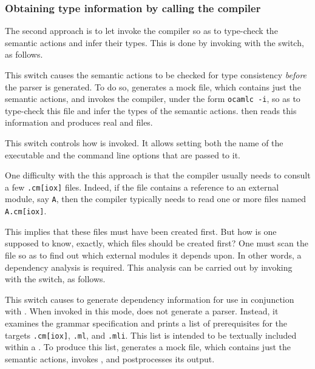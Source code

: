 \documentclass[onecolumn,11pt,nocopyrightspace,preprint]{sigplanconf}
\begin{document}
\subsubsection{Obtaining \ocaml type information by calling the \ocaml compiler}
\label{sec:build:infer:direct}

The second approach is to let \menhir invoke the \ocaml compiler so as to
type-check the semantic actions and infer their types. This is done by
invoking \menhir with the \oinfer switch, as follows.

\docswitch{\oinfer} This switch causes the semantic actions to be checked for
type consistency \emph{before} the parser is generated. To do so, \menhir
generates a mock \ml file, which contains just the semantic actions, and
invokes the \ocaml compiler, under the form \verb+ocamlc -i+, so as to
type-check this file and infer the types of the semantic actions. \menhir then
reads this information and produces real \ml and \mli files.


 This switch controls how \ocamlc is invoked.
It allows setting both the name of the executable and the command line options
that are passed to it.

\docskip

One difficulty with the this approach is that the \ocaml compiler usually
needs to consult a few \texttt{.cm[iox]} files. Indeed, if the \mly file
contains a reference to an external \ocaml module, say \texttt{A}, then the
\ocaml compiler typically needs to read one or more files named
\texttt{A.cm[iox]}.

This implies that these files must have been created first. But how is one
supposed to know, exactly, which files should be created first? One must scan
the \mly file so as to find out which external modules it depends upon. In
other words, a dependency analysis is required. This analysis can be carried
out by invoking \menhir with the \odepend switch, as follows.

\docswitch{\odepend} This switch causes \menhir to generate dependency
information for use in conjunction with \make. When invoked in this mode,
\menhir does not generate a parser. Instead, it examines the grammar
specification and prints a list of prerequisites for the targets
\texttt{.cm[iox]}, \texttt{.ml}, and
\texttt{.mli}. This list is intended to be textually included
within a \Makefile.
%
%
To produce this list, \menhir generates a mock \ml file, which contains just
the semantic actions, invokes \ocamldep, and postprocesses its output.
\end{document}

